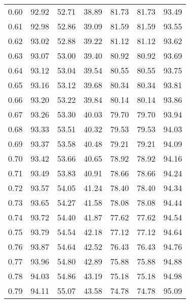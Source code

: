 \begin{tabular}{|c|c|c|c|c|c|c|}
      0.60 &     92.92 &     52.71 &      38.89 &   81.73 &      81.73 &         93.49 \\
      0.61 &     92.98 &     52.86 &      39.09 &   81.59 &      81.59 &         93.55 \\
      0.62 &     93.02 &     52.88 &      39.22 &   81.12 &      81.12 &         93.62 \\
      0.63 &     93.07 &     53.00 &      39.40 &   80.92 &      80.92 &         93.69 \\
      0.64 &     93.12 &     53.04 &      39.54 &   80.55 &      80.55 &         93.75 \\
      0.65 &     93.16 &     53.12 &      39.68 &   80.34 &      80.34 &         93.81 \\
      0.66 &     93.20 &     53.22 &      39.84 &   80.14 &      80.14 &         93.86 \\
      0.67 &     93.26 &     53.30 &      40.03 &   79.70 &      79.70 &         93.94 \\
      0.68 &     93.33 &     53.51 &      40.32 &   79.53 &      79.53 &         94.03 \\
      0.69 &     93.37 &     53.58 &      40.48 &   79.21 &      79.21 &         94.09 \\
      0.70 &     93.42 &     53.66 &      40.65 &   78.92 &      78.92 &         94.16 \\
      0.71 &     93.49 &     53.83 &      40.91 &   78.66 &      78.66 &         94.24 \\
      0.72 &     93.57 &     54.05 &      41.24 &   78.40 &      78.40 &         94.34 \\
      0.73 &     93.65 &     54.27 &      41.58 &   78.08 &      78.08 &         94.44 \\
      0.74 &     93.72 &     54.40 &      41.87 &   77.62 &      77.62 &         94.54 \\
      0.75 &     93.79 &     54.54 &      42.18 &   77.12 &      77.12 &         94.64 \\
      0.76 &     93.87 &     54.64 &      42.52 &   76.43 &      76.43 &         94.76 \\
      0.77 &     93.96 &     54.80 &      42.89 &   75.88 &      75.88 &         94.88 \\
      0.78 &     94.03 &     54.86 &      43.19 &   75.18 &      75.18 &         94.98 \\
      0.79 &     94.11 &     55.07 &      43.58 &   74.78 &      74.78 &         95.09 \\

\end{tabular}
